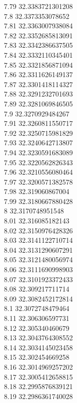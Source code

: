 {7.79	32.3383721301208\\
7.8	32.3373353078652\\
7.81	32.3363007938084\\
7.82	32.3352685813091\\
7.83	32.3342386637505\\
7.84	32.3332110345401\\
7.85	32.3321856871094\\
7.86	32.3311626149137\\
7.87	32.3301418114327\\
7.88	32.3291232701693\\
7.89	32.3281069846505\\
7.9	32.3270929484267\\
7.91	32.3260811550717\\
7.92	32.3250715981829\\
7.93	32.3240642713807\\
7.94	32.3230591683089\\
7.95	32.3220562826343\\
7.96	32.3210556080464\\
7.97	32.3200571382578\\
7.98	32.319060867004\\
7.99	32.3180667880428\\
8	32.3170748951548\\
8.01	32.316085182143\\
8.02	32.3150976428326\\
8.03	32.3141122710714\\
8.04	32.3131290607291\\
8.05	32.3121480056974\\
8.06	32.3111690998903\\
8.07	32.3101923372433\\
8.08	32.309217711714\\
8.09	32.3082452172814\\
8.1	32.3072748479464\\
8.11	32.306306597731\\
8.12	32.305340460679\\
8.13	32.3043764308552\\
8.14	32.3034145023458\\
8.15	32.302454669258\\
8.16	32.3014969257202\\
8.17	32.3005412658815\\
8.18	32.2995876839121\\
8.19	32.2986361740028\\
}
